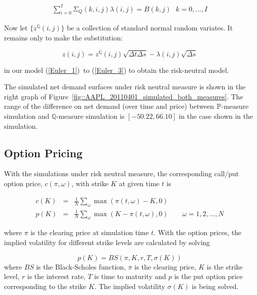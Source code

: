 \documentclass{article}
\begin{document}
\begin{eqnarray}  \label{eqn::market_price_risk_equation}
\sum_{i=0}^{I}\Sigma _{Q}(k,i,j)\lambda (i,j)=B(k,j)\text{ \ \ \ }k=0,...,I
\end{eqnarray}

Now let $\{z^{\mathbb{Q}}(i,j)\}$ be a collection of standard normal random
variates. It remains only to make the substitution:

\begin{equation*}
z(i,j)=z^{\mathbb{Q}}(i,j)\sqrt{\Delta t\Delta s}-\lambda (i,j)\sqrt{\Delta s%
}
\end{equation*}

in our model (\ref{Euler_1})\ to (\ref{Euler_3}) to obtain the risk-neutral
model.

The simulated net demand surfaces under risk neutral measure is shown in the
right graph of Figure~\ref{fig::AAPL_20110401_simulated_both_measures}. The
range of the difference on net demand (over time and price) between $\mathbb{%
P}$-measure simulation and $\mathbb{Q}$-measure simulation is $[-50.22,66.10]
$ in the case shown in the simulation.

\subsection{Option Pricing}

With the simulations under risk neutral measure, the corresponding call/put
option price, $c(\pi, \omega)$, with strike $K$ at given time $t$ is

\begin{eqnarray*}
c(K) &=& \frac{1}{N} \sum_{\omega} \max\left(\pi(t,\omega)-K,0\right) \\
p(K) &=& \frac{1}{N} \sum_{\omega} \max\left(K - \pi(t,\omega),0\right)
\qquad \omega = 1,2,\ldots,N
\end{eqnarray*}

where $\pi$ is the clearing price at simulation time $t$. With the option
prices, the implied volatility for different strike levels are calculated by
solving

\begin{equation*}
p(K)=BS(\pi ,K,r,T,\sigma (K))
\end{equation*}%
where $BS$ is the Black-Scholes function, $\pi $ is the clearing price, $K$
is the strike level, $r$ is the interest rate, $T$ is time to maturity and $%
p $ is the put option price corresponding to the strike $K$. The implied
volatility $\sigma (K)$ is being solved.
\end{document}
